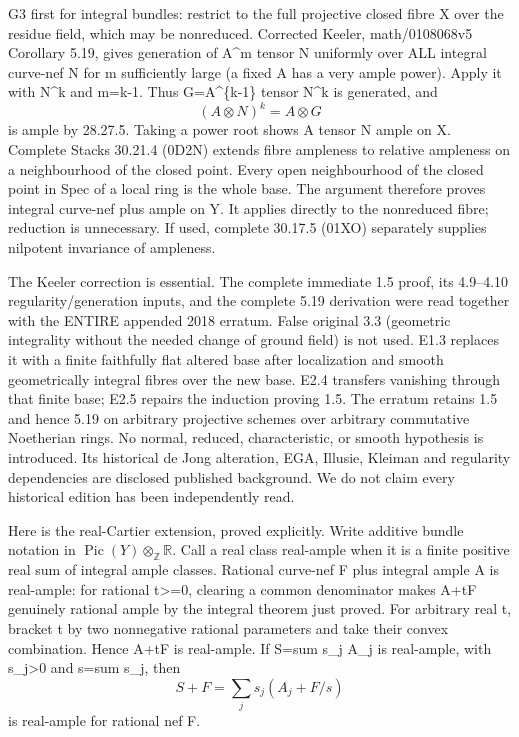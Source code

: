 \documentclass[11pt]{article}
\begin{document}
G3 first for integral bundles: restrict to the full projective closed fibre X over the residue field, which may be nonreduced. Corrected Keeler, math/0108068v5 Corollary 5.19, gives generation of A\textasciicircum{}m tensor N uniformly over ALL integral curve-nef N for m sufficiently large (a fixed A has a very ample power). Apply it with N\textasciicircum{}k and m=k-1. Thus G=A\textasciicircum{}\{k-1\} tensor N\textasciicircum{}k is generated, and
\[
(A\otimes N)^k=A\otimes G
\]
is ample by 28.27.5. Taking a power root shows A tensor N ample on X. Complete Stacks 30.21.4 (0D2N) extends fibre ampleness to relative ampleness on a neighbourhood of the closed point. Every open neighbourhood of the closed point in Spec of a local ring is the whole base. The argument therefore proves integral curve-nef plus ample on Y. It applies directly to the nonreduced fibre; reduction is unnecessary. If used, complete 30.17.5 (01XO) separately supplies nilpotent invariance of ampleness.

The Keeler correction is essential. The complete immediate 1.5 proof, its 4.9--4.10 regularity/generation inputs, and the complete 5.19 derivation were read together with the ENTIRE appended 2018 erratum. False original 3.3 (geometric integrality without the needed change of ground field) is not used. E1.3 replaces it with a finite faithfully flat altered base after localization and smooth geometrically integral fibres over the new base. E2.4 transfers vanishing through that finite base; E2.5 repairs the induction proving 1.5. The erratum retains 1.5 and hence 5.19 on arbitrary projective schemes over arbitrary commutative Noetherian rings. No normal, reduced, characteristic, or smooth hypothesis is introduced. Its historical de Jong alteration, EGA, Illusie, Kleiman and regularity dependencies are disclosed published background. We do not claim every historical edition has been independently read.

Here is the real-Cartier extension, proved explicitly. Write additive bundle notation in \(\operatorname{Pic}(Y)\otimes_{\mathbb Z}\mathbb R\). Call a real class real-ample when it is a finite positive real sum of integral ample classes. Rational curve-nef F plus integral ample A is real-ample: for rational t>=0, clearing a common denominator makes A+tF genuinely rational ample by the integral theorem just proved. For arbitrary real t, bracket t by two nonnegative rational parameters and take their convex combination. Hence A+tF is real-ample. If S=sum s\_j A\_j is real-ample, with s\_j>0 and s=sum s\_j, then
\[
S+F=\sum_j s_j(A_j+F/s)
\]
is real-ample for rational nef F.
\end{document}
